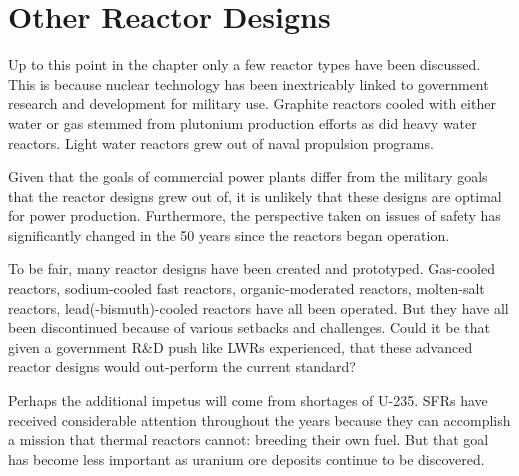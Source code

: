 \section{Other Reactor Designs}
Up to this point in the chapter only a few reactor types have been discussed. This is because nuclear technology has been inextricably linked to government research and development for military use. 
Graphite reactors cooled with either water or gas stemmed from plutonium production efforts as did heavy water reactors. %
Light water reactors grew out of naval propulsion programs. 

Given that the goals of commercial power plants differ from the military goals that the reactor designs grew out of, it is unlikely that these designs are optimal for power production. Furthermore, the perspective taken on issues of safety has significantly changed in the 50 years since the reactors began operation. 

To be fair, many reactor designs have been created and prototyped. Gas-cooled reactors, sodium-cooled fast reactors, organic-moderated reactors, molten-salt reactors, lead(-bismuth)-cooled reactors have all been operated. But they have all been discontinued because of various setbacks and challenges. Could it be that given a government R\&D push like LWRs experienced, that these advanced reactor designs would out-perform the current standard?

Perhaps the additional impetus will come from shortages of U-235. SFRs have received considerable attention throughout the years because they can accomplish a mission that thermal reactors cannot: breeding their own fuel.
But that goal has become less important as uranium ore deposits continue to be discovered.



